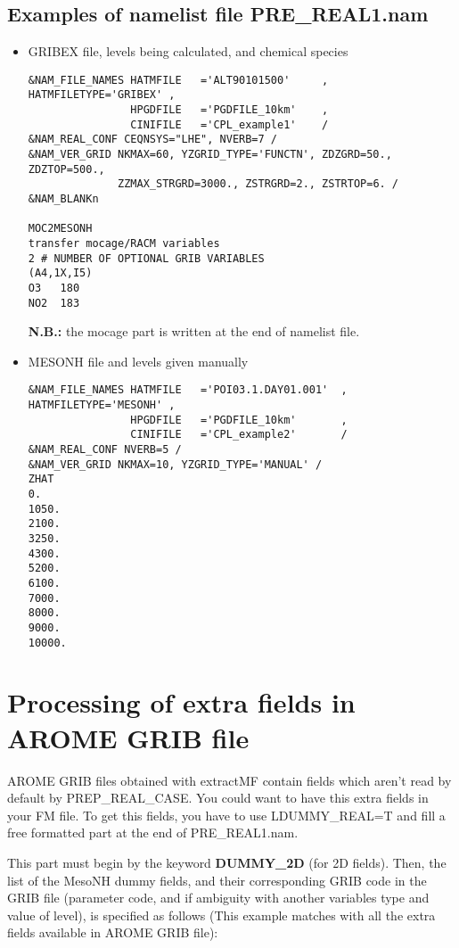 \subsection{Examples of namelist file PRE\_REAL1.nam}
\begin{itemize}
\item GRIBEX file, levels being calculated, and chemical species
\begin{verbatim}
&NAM_FILE_NAMES HATMFILE   ='ALT90101500'     , HATMFILETYPE='GRIBEX' ,
                HPGDFILE   ='PGDFILE_10km'    ,
                CINIFILE   ='CPL_example1'    /
&NAM_REAL_CONF CEQNSYS="LHE", NVERB=7 /
&NAM_VER_GRID NKMAX=60, YZGRID_TYPE='FUNCTN', ZDZGRD=50., ZDZTOP=500., 
              ZZMAX_STRGRD=3000., ZSTRGRD=2., ZSTRTOP=6. /
&NAM_BLANKn
              
MOC2MESONH
transfer mocage/RACM variables 
2 # NUMBER OF OPTIONAL GRIB VARIABLES
(A4,1X,I5)
O3   180
NO2  183
\end{verbatim}
{\bf N.B.:} the mocage part is written at the end of namelist file.
\subitem

\item MESONH file and levels given manually
\begin{verbatim}
&NAM_FILE_NAMES HATMFILE   ='POI03.1.DAY01.001'  , HATMFILETYPE='MESONH' ,
                HPGDFILE   ='PGDFILE_10km'       ,
                CINIFILE   ='CPL_example2'       /
&NAM_REAL_CONF NVERB=5 /
&NAM_VER_GRID NKMAX=10, YZGRID_TYPE='MANUAL' /
ZHAT
0.
1050.
2100.
3250.
4300.
5200.
6100.
7000.
8000.
9000.
10000.
\end{verbatim}
\end{itemize}


\section{Processing of extra fields in AROME GRIB file}
\label{i:realdummy}

AROME GRIB files obtained with extractMF contain fields which aren't read by default by PREP\_REAL\_CASE. You could want to have this extra fields in your FM file. To get this fields, you have to use LDUMMY\_REAL=T and fill a free formatted part at the end of PRE\_REAL1.nam.

This part must begin by the keyword {\bf DUMMY\_2D} (for 2D fields).
Then, the list of the MesoNH dummy fields, and their corresponding GRIB code in the GRIB file (parameter code, and if 
ambiguity with another variables type and value of level),
 is specified as follows (This example  matches with all the extra fields available in AROME GRIB file): 


